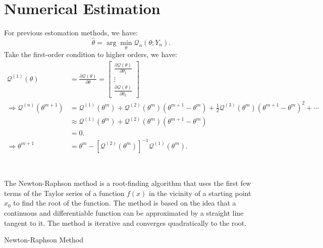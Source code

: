 \section{Numerical Estimation}

For previous estomation methods, we have:
\[
\hat{\theta} = \arg \min_{\theta} \mathcal{Q}_n (\theta; Y_n).
\]
Take the first-order condition to higher orders, we have:
\begin{align*}
    \mathcal{Q}^{(1)}(\theta ) &= \frac{\partial \mathcal{Q}(\theta)}{\partial \theta} = \begin{bmatrix}
        \frac{\partial \mathcal{Q}(\theta)}{\partial \theta_1} \\
        \vdots \\
        \frac{\partial \mathcal{Q}(\theta)}{\partial \theta_k}
    \end{bmatrix} \\
    \Rightarrow 
    \mathcal{Q}^{(n)}(\theta^{m+1}) &= \mathcal{Q}^{(1)}(\theta^{m}) + \mathcal{Q}^{(2)}(\theta^{m}) (\theta^{m+1} - \theta^{m}) + \frac{1}{2} \mathcal{Q}^{(3)}(\theta^{m}) (\theta^{m+1} - \theta^{m})^2 + \cdots \\
    & \approx \mathcal{Q}^{(1)}(\theta^{m}) + \mathcal{Q}^{(2)}(\theta^{m}) (\theta^{m+1} - \theta^{m}) \\
    &= 0. \\
    \Rightarrow \theta^{m+1} &= \theta^{m} - \left[\mathcal{Q}^{(2)}(\theta^{m})\right]^{-1} \mathcal{Q}^{(1)}(\theta^{m}).
\end{align*}

\begin{note}
    \

    The Newton-Raphson method is a root-finding algorithm that uses the first few terms of the Taylor series of a function $f(x)$ in the vicinity of a starting point $x_0$ to find the root of the function. 
    The method is based on the idea that a continuous and differentiable function can be approximated by a straight line tangent to it. 
    The method is iterative and converges quadratically to the root.

    \begin{algorithm}[H]
        \caption{Newton-Raphson Method}
        \SetAlgoLined
        
        
    \end{algorithm}
\end{note}

